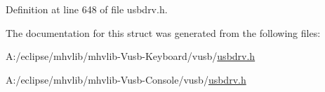 Definition at line 648 of file usbdrv.\-h.



The documentation for this struct was generated from the following files\-:\begin{DoxyCompactItemize}
\item 
A\-:/eclipse/mhvlib/mhvlib-\/\-Vusb-\/\-Keyboard/vusb/\hyperlink{mhvlib-_vusb-_keyboard_2vusb_2usbdrv_8h}{usbdrv.\-h}\item 
A\-:/eclipse/mhvlib/mhvlib-\/\-Vusb-\/\-Console/vusb/\hyperlink{mhvlib-_vusb-_console_2vusb_2usbdrv_8h}{usbdrv.\-h}\end{DoxyCompactItemize}
